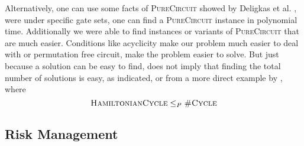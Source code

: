 Alternatively, one can use some facts of \textsc{PureCircuit} showed by Deligkas et al.
\cite{deligkas_pure-circuit_2024}, were under specific 
gate sets, one can find a \textsc{PureCircuit} instance in polynomial time.
Additionally we were able to find instances or variants of \textsc{PureCircuit}
that are much easier. Conditions like acyclicity make our problem much easier to deal with
or permutation free circuit, make the problem easier to solve.
But just because a solution can be easy to find, does not imply that finding the total number of solutions
is easy, as \cite{valiant_complexity_1979} indicated, or from a more direct
example by \cite{arora_computational_2009}, where
$$
\textsc{HamiltonianCycle} \leq_P \textsc{\#Cycle}
$$


\subsection{Risk Management}


